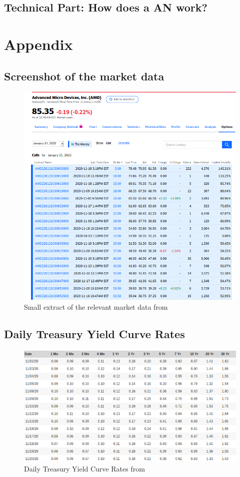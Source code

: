 \documentclass[11pt,oneside,a4paper]{article}
\makeatletter
\def\cleardoublepage{\clearpage\if@twoside \ifodd\c@page\else%
	\hbox{}%
	\thispagestyle{empty}%
	\clearpage%
	\if@twocolumn\hbox{}\clearpage\fi\fi\fi}
\makeatother
\begin{document}
	\subsection{Technical Part: How does a AN work?}
	\cleardoublepage
	\section{Appendix}
	\subsection{Screenshot of the market data}
	\begin{figure}[H]
		\centering
		\includegraphics[width=\linewidth]{screenshot.png}
		\caption{\label{treasure}Small extract of the relevant market data from \cite{site_yahoofinance}} 
	\end{figure}
	\subsection{Daily Treasury Yield Curve Rates}
	\begin{figure}[H]
		\centering
		\includegraphics[width=0.8\linewidth]{treasure.png}
		\caption{\label{treasure}Daily Treasury Yield Curve Rates from \cite{site_treasure}} 
	\end{figure}
	\newpage
	
	
	
	 
\end{document}
